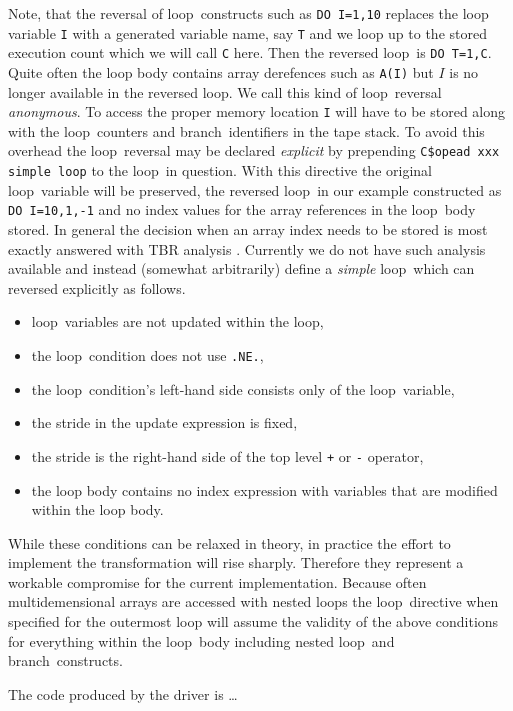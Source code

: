 \documentclass[acmtocl,acmnow]{acmtrans2m}
\newcommand{\Loop}{loop}
\newcommand{\branch}{branch}
\newcommand{\code}[1]{{\small\tt{#1}}}
\begin{document}
Note, that the reversal of  \Loop\ constructs such as \code{DO I=1,10} replaces 
the loop variable \code{I} with a generated variable name, say \code{T} and we 
loop up to  the stored execution count which we will call  \code{C} here. 
Then the reversed \Loop\ is \code{DO T=1,C}. Quite often the loop body contains 
array derefences such as \code{A(I)} but ${I}$ is no longer available in the 
reversed \Loop. We call this kind of \Loop\ reversal {\em anonymous}. 
To access the proper memory location \code{I} will have to be stored along with the 
\Loop\ counters and \branch\ identifiers in the tape stack.
To avoid this overhead the \Loop\ reversal may be declared {\em explicit}
by prepending \code{C\$opead xxx simple loop} to the \Loop\ in question. 
With this directive the original \Loop\ variable will be preserved,  
the reversed \Loop\ in our example constructed as \code{DO I=10,1,-1} and 
no index values for the array references in the \Loop\ body stored. 
In general the decision when an array index needs to be stored is most  exactly answered 
with TBR analysis \cite{HNP02}. 
Currently we do not have such  analysis available and instead 
(somewhat arbitrarily) define a {\em simple}
\Loop\ which can reversed explicitly as follows. 
\begin{itemize}
\item \Loop\ variables are not updated within the loop,
\item the \Loop\ condition does not use \code{.NE.},
\item the \Loop\ condition's left-hand side consists only of the \Loop\ variable,
\item the stride in the update expression is fixed,
\item the stride is the right-hand side of the top level \code{+} or \code{-} operator,
\item the loop body contains no index expression with variables that are modified within the loop body.
\end{itemize}
While these conditions can be relaxed in theory, in practice the effort to implement 
the transformation will rise sharply. Therefore they represent a workable compromise 
for the current implementation. 
Because often multidemensional arrays  are accessed with nested loops the 
\Loop\ directive when specified for the outermost loop will assume the validity 
of the above conditions for everything within the \Loop\ body including nested 
\Loop\ and \branch\ constructs. 

{\color{Red} The code produced by the driver is \ldots} 
\end{document}
